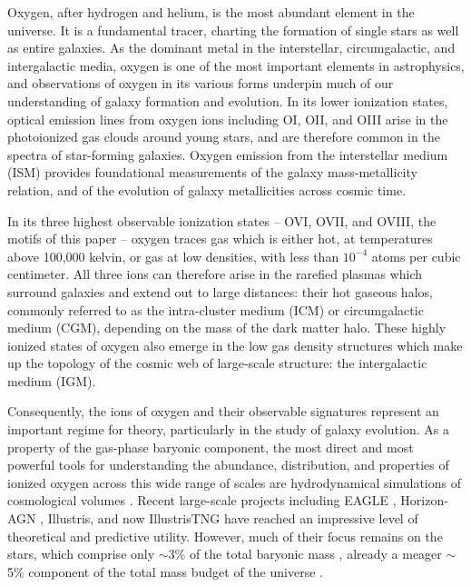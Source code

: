 \documentclass[useAMS,usenatbib]{mnras}
\newcommand{\ovi}{OVI\xspace}
\newcommand{\ovii}{OVII\xspace}
\newcommand{\oviii}{OVIII\xspace}
\begin{document}
Oxygen, after hydrogen and helium, is the most abundant element in the universe. It is a fundamental tracer, charting the formation of single stars as well as entire galaxies. As the dominant metal in the interstellar, circumgalactic, and intergalactic media, oxygen is one of the most important elements in astrophysics, and observations of oxygen in its various forms underpin much of our understanding of galaxy formation and evolution. In its lower ionization states, optical emission lines from oxygen ions including OI, OII, and OIII arise in the photoionized gas clouds around young stars, and are therefore common in the spectra of star-forming galaxies. Oxygen emission from the interstellar medium (ISM) provides foundational measurements of the galaxy mass-metallicity relation, and of the evolution of galaxy metallicities across cosmic time.

In its three highest observable ionization states -- \ovi, \ovii, and \oviii, the motifs of this paper -- oxygen traces gas which is either hot, at temperatures above 100,000 kelvin, or gas at low densities, with less than $10^{-4}$ atoms per cubic centimeter. All three ions can therefore arise in the rarefied plasmas which surround galaxies and extend out to large distances: their hot gaseous halos, commonly referred to as the intra-cluster medium (ICM) or circumgalactic medium (CGM), depending on the mass of the dark matter halo. These highly ionized states of oxygen also emerge in the low gas density structures which make up the topology of the cosmic web of large-scale structure: the intergalactic medium (IGM).

Consequently, the ions of oxygen and their observable signatures represent an important regime for theory, particularly in the study of galaxy evolution. As a property of the gas-phase baryonic component, the most direct and most powerful tools for understanding the abundance, distribution, and properties of ionized oxygen across this wide range of scales are hydrodynamical simulations of cosmological volumes \citep{hernquist89,katz91,cen92,navarro93}. Recent large-scale projects including EAGLE \citep{schaye15,crain15}, Horizon-AGN \citep{dubois14}, Illustris, and now IllustrisTNG have reached an impressive level of theoretical and predictive utility. However, much of their focus remains on the stars, which comprise only $\sim$3\% of the total baryonic mass \citep{fukugita04}, already a meager $\sim$5\% component of the total mass budget of the universe \citep{planck2015_xiii}.
\end{document}
